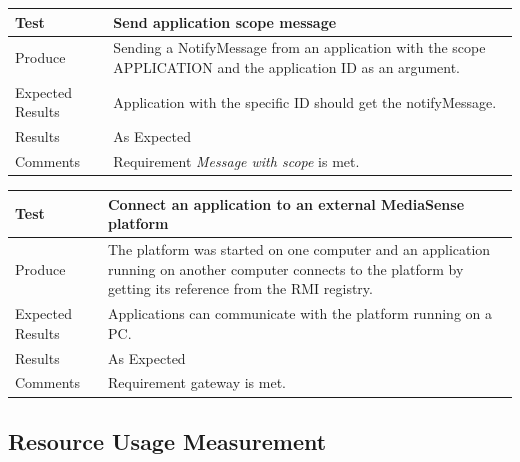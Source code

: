 \begin{center}
    \begin{tabular}{ | l | p{12cm} |}
    \hline
    Test 	 				& 		 Send application scope message\\ \hline
	Produce  				& 		 Sending a NotifyMessage from an application with the scope APPLICATION and the application ID as an argument. \\ \hline
	Expected Results  		& 		 Application with the specific ID should get the notifyMessage. \\ \hline
	Results 				& 		 As Expected\\ \hline
	Comments				& 		 Requirement \emph{Message with scope} is met.\\ \hline
    \end{tabular}
\end{center}

\begin{center}
    \begin{tabular}{ | l | p{12cm} |}
    \hline
    Test 	 				& 		 Connect an application to an external MediaSense platform\\ \hline
	Produce  				& 		 The platform was started on one computer and an application running on another computer connects to the platform by getting its reference from the RMI registry.\\ \hline
	Expected Results  		& 		 Applications can communicate with the platform running on a PC. \\ \hline
	Results 				& 		 As Expected\\ \hline
	Comments				& 		 Requirement gateway is met. \\ \hline
    \end{tabular}
\end{center}

\subsection{Resource Usage Measurement}


